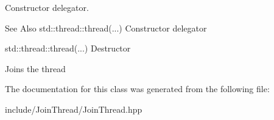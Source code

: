 Constructor delegator. 

\begin{DoxySeeAlso}{See Also}
std\-::thread\-::thread(...) Constructor delegator

std\-::thread\-::thread(...) Destructor
\end{DoxySeeAlso}
Joins the thread 

The documentation for this class was generated from the following file\-:\begin{DoxyCompactItemize}
\item 
include/\-Join\-Thread/Join\-Thread.\-hpp\end{DoxyCompactItemize}
